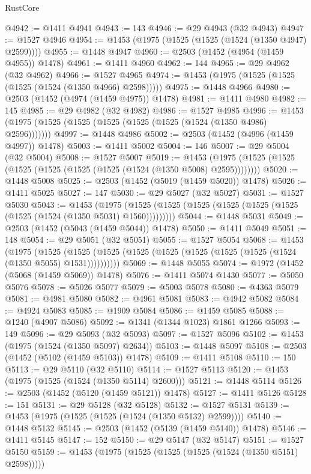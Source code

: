 \begin{lexlean}{RustCore}
\begin{coremodule}
{\begin{coremodule}
{{{{{{{{{{{{{{{{{{{{{{{{{{{{{{{{{{{{{{{{{{{{{@4942 := @1411 @4941
@4943 := 143
@4946 := @29 @4943 (@32 @4943)
@4947 := @1527 @4946
@4954 := @1453 (@1975 (@1525 (@1525 (@1524 (@1350 @4947) @2599))))
@4955 := @1448 @4947
@4960 := @2503 (@1452 (@4954 (@1459 @4955)) @1478)
@4961 := @1411 @4960
@4962 := 144
@4965 := @29 @4962 (@32 @4962)
@4966 := @1527 @4965
@4974 := @1453 (@1975 (@1525 (@1525 (@1525 (@1524 (@1350 @4966) @2598)))))
@4975 := @1448 @4966
@4980 := @2503 (@1452 (@4974 (@1459 @4975)) @1478)
@4981 := @1411 @4980
@4982 := 145
@4985 := @29 @4982 (@32 @4982)
@4986 := @1527 @4985
@4996 := @1453 (@1975 (@1525 (@1525 (@1525 (@1525 (@1525 (@1524 (@1350 @4986) @2596)))))))
@4997 := @1448 @4986
@5002 := @2503 (@1452 (@4996 (@1459 @4997)) @1478)
@5003 := @1411 @5002
@5004 := 146
@5007 := @29 @5004 (@32 @5004)
@5008 := @1527 @5007
@5019 := @1453 (@1975 (@1525 (@1525 (@1525 (@1525 (@1525 (@1525 (@1524 (@1350 @5008) @2595))))))))
@5020 := @1448 @5008
@5025 := @2503 (@1452 (@5019 (@1459 @5020)) @1478)
@5026 := @1411 @5025
@5027 := 147
@5030 := @29 @5027 (@32 @5027)
@5031 := @1527 @5030
@5043 := @1453
    (@1975 (@1525 (@1525 (@1525 (@1525 (@1525 (@1525 (@1525 (@1524 (@1350 @5031) @1560)))))))))
@5044 := @1448 @5031
@5049 := @2503 (@1452 (@5043 (@1459 @5044)) @1478)
@5050 := @1411 @5049
@5051 := 148
@5054 := @29 @5051 (@32 @5051)
@5055 := @1527 @5054
@5068 := @1453
    (@1975
      (@1525 (@1525 (@1525 (@1525 (@1525 (@1525 (@1525 (@1525 (@1524 (@1350 @5055) @1531))))))))))
@5069 := @1448 @5055
@5074 := @1972 (@1452 (@5068 (@1459 @5069)) @1478)
@5076 := @1411 @5074 @1430
@5077 := @5050 @5076
@5078 := @5026 @5077
@5079 := @5003 @5078
@5080 := @4363 @5079
@5081 := @4981 @5080
@5082 := @4961 @5081
@5083 := @4942 @5082
@5084 := @4924 @5083
@5085 := @1909 @5084
@5086 := @1459 @5085
@5088 := @1240 (@4907 @5086)
@5092 := @1341 (@1344 @1023) @1861 @1266
@5093 := 149
@5096 := @29 @5093 (@32 @5093)
@5097 := @1527 @5096
@5102 := @1453 (@1975 (@1524 (@1350 @5097) @2634))
@5103 := @1448 @5097
@5108 := @2503 (@1452 (@5102 (@1459 @5103)) @1478)
@5109 := @1411 @5108
@5110 := 150
@5113 := @29 @5110 (@32 @5110)
@5114 := @1527 @5113
@5120 := @1453 (@1975 (@1525 (@1524 (@1350 @5114) @2600)))
@5121 := @1448 @5114
@5126 := @2503 (@1452 (@5120 (@1459 @5121)) @1478)
@5127 := @1411 @5126
@5128 := 151
@5131 := @29 @5128 (@32 @5128)
@5132 := @1527 @5131
@5139 := @1453 (@1975 (@1525 (@1525 (@1524 (@1350 @5132) @2599))))
@5140 := @1448 @5132
@5145 := @2503 (@1452 (@5139 (@1459 @5140)) @1478)
@5146 := @1411 @5145
@5147 := 152
@5150 := @29 @5147 (@32 @5147)
@5151 := @1527 @5150
@5159 := @1453 (@1975 (@1525 (@1525 (@1525 (@1524 (@1350 @5151) @2598)))))
}}}}}}}}}}}}}}}}}}}}}}}}}}}}}}}}}}}}}}}}}}}}}
\end{coremodule}}
\end{coremodule}
\end{lexlean}
